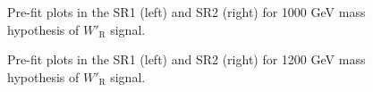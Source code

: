 \begin{figure}[H]
  \centering
  \caption{Pre-fit plots in the SR1 (left) and SR2 (right) for 1000 GeV mass hypothesis of $W'_{\text{R}}$ signal.}
  \label{fig:Prefit_WpRH1000_Asimov}
\end{figure}
\begin{figure}[H]
  \centering
  \caption{Pre-fit plots in the SR1 (left) and SR2 (right) for 1200 GeV mass hypothesis of $W'_{\text{R}}$ signal.}
  \label{fig:Prefit_WpRH1200_Asimov}
\end{figure}
